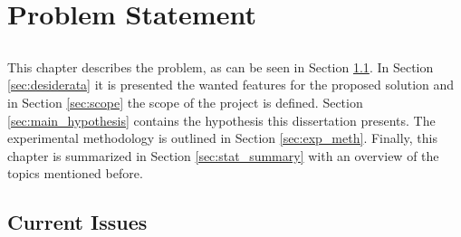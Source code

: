 \chapter{Problem Statement} \label{chap:problem_statement} \minitoc

\section*{}

This chapter describes the problem, as can be seen in Section \ref{sec:current_issues}. In Section \ref{sec:desiderata} it is presented the wanted features for the proposed solution and in Section \ref{sec:scope} the scope of the project is defined. Section \ref{sec:main_hypothesis} contains the hypothesis this dissertation presents. The experimental methodology is outlined in Section \ref{sec:exp_meth}. Finally, this chapter is summarized in Section \ref{sec:stat_summary} with an overview of the topics mentioned before.

\section{Current Issues}\label{sec:current_issues}

